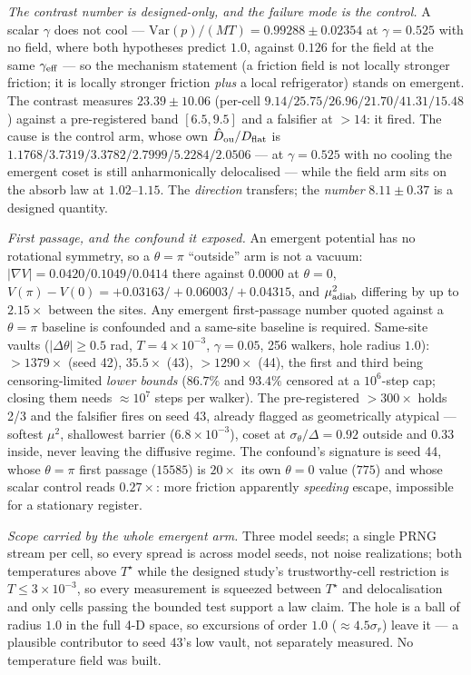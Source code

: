 \documentclass{article}
\begin{document}
\emph{The contrast number is designed-only, and the failure mode is the control.} A scalar $\gamma$ does not cool --- $\mathrm{Var}(p)/(MT)=0.99288\pm0.02354$ at $\gamma=0.525$ with no field, where both hypotheses predict $1.0$, against $0.126$ for the field at the same $\gamma_{\rm eff}$ --- so the mechanism statement (a friction field is not locally stronger friction; it is locally stronger friction \emph{plus} a local refrigerator) stands on emergent. The contrast measures $23.39\pm10.06$ (per-cell $9.14/25.75/26.96/21.70/41.31/15.48$) against a pre-registered band $[6.5,9.5]$ and a falsifier at $>14$: it fired. The cause is the control arm, whose own $\hat D_{\rm ou}/D_{\rm flat}$ is $1.1768/3.7319/3.3782/2.7999/5.2284/2.0506$ --- at $\gamma=0.525$ with no cooling the emergent coset is still anharmonically delocalised --- while the field arm sits on the absorb law at $1.02$--$1.15$. The \emph{direction} transfers; the \emph{number} $8.11\pm0.37$ is a designed quantity.

\emph{First passage, and the confound it exposed.} An emergent potential has no rotational symmetry, so a $\theta=\pi$ ``outside'' arm is not a vacuum: $|\nabla V|=0.0420/0.1049/0.0414$ there against $0.0000$ at $\theta=0$, $V(\pi)-V(0)=+0.03163/+0.06003/+0.04315$, and $\mu^2_{\rm adiab}$ differing by up to $2.15\times$ between the sites. Any emergent first-passage number quoted against a $\theta=\pi$ baseline is confounded and a same-site baseline is required. Same-site vaults ($|\Delta\theta|\ge0.5$ rad, $T=4\times10^{-3}$, $\gamma=0.05$, 256 walkers, hole radius $1.0$): $>1379\times$ (seed 42), $35.5\times$ (43), $>1290\times$ (44), the first and third being censoring-limited \emph{lower bounds} ($86.7\%$ and $93.4\%$ censored at a $10^6$-step cap; closing them needs $\approx10^7$ steps per walker). The pre-registered $>300\times$ holds 2/3 and the falsifier fires on seed 43, already flagged as geometrically atypical --- softest $\mu^2$, shallowest barrier ($6.8\times10^{-3}$), coset at $\sigma_\theta/\Delta=0.92$ outside and $0.33$ inside, never leaving the diffusive regime. The confound's signature is seed 44, whose $\theta=\pi$ first passage ($15585$) is $20\times$ its own $\theta=0$ value ($775$) and whose scalar control reads $0.27\times$: more friction apparently \emph{speeding} escape, impossible for a stationary register.

\emph{Scope carried by the whole emergent arm.} Three model seeds; a single PRNG stream per cell, so every spread is across model seeds, not noise realizations; both temperatures above $T^\star$ while the designed study's trustworthy-cell restriction is $T\le3\times10^{-3}$, so every measurement is squeezed between $T^\star$ and delocalisation and only cells passing the bounded test support a law claim. The hole is a ball of radius $1.0$ in the full 4-D space, so excursions of order $1.0$ ($\approx4.5\sigma_r$) leave it --- a plausible contributor to seed 43's low vault, not separately measured. No temperature field was built.
\end{document}
